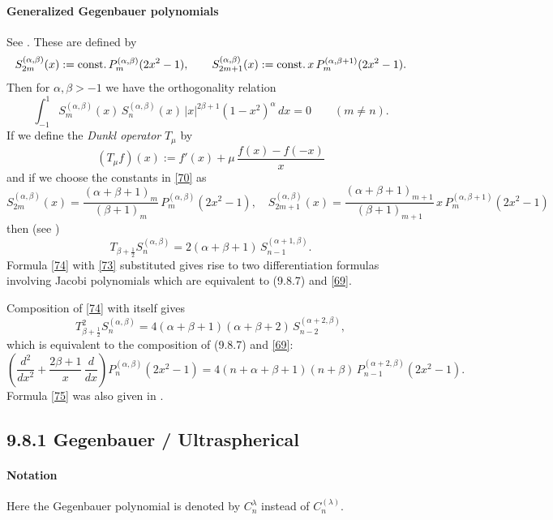 \documentclass[twoside,11pt]{article}
\newcommand\al\alpha
\newcommand\be\beta
\newcommand\la\lambda
\newcommand\half{\frac12}
\newcommand\const{{\rm const.}\,}
\begin{document}
\paragraph{Generalized Gegenbauer polynomials}
See \cite[p.156]{146}.
These are defined by
\begin{equation}
S_{2m}^{(\al,\be)}(x):=\const P_m^{(\al,\be)}(2x^2-1),\qquad
S_{2m+1}^{(\al,\be)}(x):=\const x\,P_m^{(\al,\be+1)}(2x^2-1).
\label{70}
\end{equation}
Then for $\al,\be>-1$ we have the orthogonality relation
\begin{equation}
\int_{-1}^1 S_m^{(\al,\be)}(x)\,S_n^{(\al,\be)}(x)\,|x|^{2\be+1}(1-x^2)^\al\,dx
=0\qquad(m\ne n).
\label{71}
\end{equation}
If we define the {\em Dunkl operator} $T_\mu$ by
\begin{equation}
(T_\mu f)(x):=f'(x)+\mu\,\frac{f(x)-f(-x)}x
\label{72}
\end{equation}
and if we choose the constants in \eqref{70} as
\begin{equation}
S_{2m}^{(\al,\be)}(x)=\frac{(\al+\be+1)_m}{(\be+1)_m}\, P_m^{(\al,\be)}(2x^2-1),\quad
S_{2m+1}^{(\al,\be)}(x)=\frac{(\al+\be+1)_{m+1}}{(\be+1)_{m+1}}\,
x\,P_m^{(\al,\be+1)}(2x^2-1)
\label{73}
\end{equation}
then (see \cite[(1.6)]{K5})
\begin{equation}
T_{\be+\half}S_n^{(\al,\be)}=2(\al+\be+1)\,S_{n-1}^{(\al+1,\be)}.
\label{74}
\end{equation}
Formula \eqref{74} with \eqref{73} substituted gives rise to two
differentiation formulas involving Jacobi polynomials which are equivalent to
(9.8.7) and \eqref{69}.

Composition of \eqref{74} with itself gives
\[
T_{\be+\half}^2S_n^{(\al,\be)}=4(\al+\be+1)(\al+\be+2)\,S_{n-2}^{(\al+2,\be)},
\]
which is equivalent to the composition of (9.8.7) and \eqref{69}:
\begin{equation}
\left(\frac{d^2}{dx^2}+\frac{2\be+1}x\,\frac d{dx}\right)P_n^{(\al,\be)}(2x^2-1)
=4(n+\al+\be+1)(n+\be)\,P_{n-1}^{(\al+2,\be)}(2x^2-1).
\label{75}
\end{equation}
Formula \eqref{75} was also given in \cite[(2.4)]{322}.
%
\subsection*{9.8.1 Gegenbauer / Ultraspherical}
%
\paragraph{Notation}
Here the Gegenbauer polynomial is denoted by $C_n^\la$ instead of $C_n^{(\la)}$.
%
\end{document}
